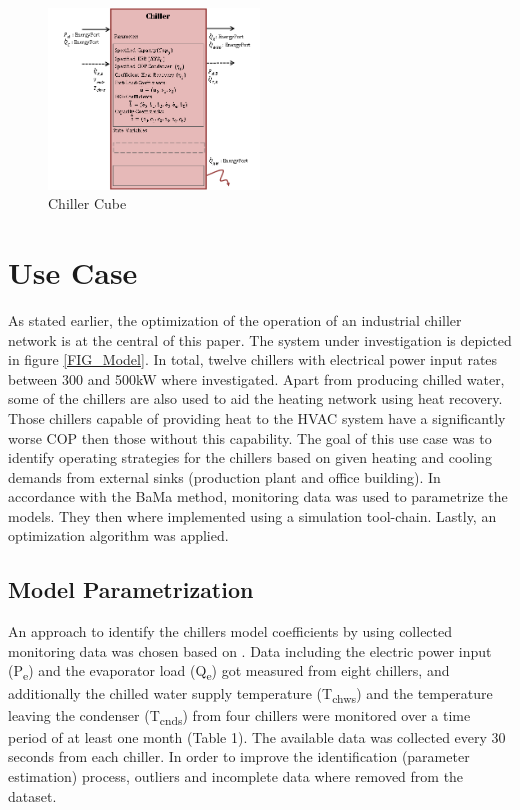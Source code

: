 \documentclass[3p,times,procedia,twocolumn,twoside]{elsarticle}
\begin{document}
\begin{figure}
	\includegraphics[width=0.5\textwidth]{figures/Chiller_Cube}
	\caption{Chiller Cube}
	\label{FIG_Cube}
\end{figure}
\section{Use Case}
As stated earlier, the optimization of the operation of an industrial chiller network is at the central of this paper. The system under investigation is depicted in figure \ref{FIG_Model}. In total, twelve chillers with electrical power input rates between 300 and 500kW where investigated. Apart from producing chilled water, some of the chillers are also used to aid the heating network using heat recovery. Those chillers capable of providing heat to the HVAC system have a significantly worse COP then those without this capability. The goal of this use case was to identify operating strategies for the chillers based on given heating and cooling demands from external sinks (production plant and office building). In accordance with the BaMa method, monitoring data was used to parametrize the models. They then where implemented using a simulation tool-chain. Lastly, an optimization algorithm was applied. 

\subsection{Model Parametrization}
An approach to identify the chillers model coefficients by using collected monitoring data was chosen based on \cite{Monfet}. Data including the electric power input (P\textsubscript{e}) and the evaporator load (Q\textsubscript{e}) got measured from eight chillers, and additionally the chilled water supply temperature (T\textsubscript{chws}) and the temperature leaving the condenser (T\textsubscript{cnds}) from four chillers were monitored over a time period of at least one month (Table 1). The available data was collected every 30 seconds from each chiller. In order to improve the identification (parameter estimation) process, outliers and incomplete data where removed from the dataset. 
\end{document}
